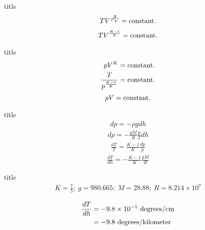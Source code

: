 \documentclass[dvipdfmx, 10pt, aspectratio = 169]{beamer}
\begin{document}
\begin{frame}{title}
	\begin{align*}
		TV^{\frac{R}{C_V}} = {\rm constant.}
	\end{align*}
	\begin{align}
		TV^{\frac{K-1}{K}} = {\rm constant.}
	\end{align}
\end{frame}

\begin{frame}{title}
	\begin{align}
		pV^K &= {\rm constant.} \\
		\frac{T}{p^{\frac{K-1}{K}}} &= {\rm constant.}
	\end{align}
	\begin{align*}
		pV = {\rm constant.}
	\end{align*}
\end{frame}

\begin{frame}{title}
	\begin{align}
		dp = - \rho gdh
	\end{align}
	\begin{align*}
		dp = -\frac{gM}{R} \frac{p}{T}dh
	\end{align*}
	\begin{align*}
		\frac{dT}{T} = \frac{K-1}{K} \frac{dp}{p}
	\end{align*}
	\begin{align}
		\frac{dT}{dh} = -\frac{K-1}{K} \frac{gM}{R}
	\end{align}
\end{frame}

\begin{frame}{title}
	\begin{align*}
		K = \frac{7}{5}; \ g = 980.665; \ M = 28.88; \ R=8.214 \times 10^7
	\end{align*}
	
	\begin{align*}
		\frac{dT}{dh} &= -9.8 \times 10^{-5} \ {\rm degrees / cm} \\
		&= -9.8 \ {\rm degrees / kilometer}
	\end{align*}
\end{frame}
\end{document}
